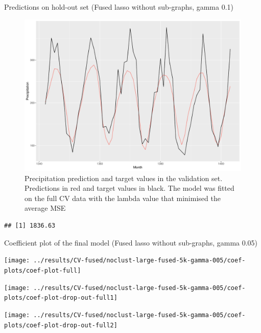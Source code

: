 \documentclass[
  ignorenonframetext,
]{beamer}
\begin{document}
\begin{frame}[fragile]{Predictions on hold-out set (Fused lasso without
sub-graphs, gamma 0.1)}
\protect\hypertarget{predictions-on-hold-out-set-fused-lasso-without-sub-graphs-gamma-0.1-1}{}
\begin{figure}

{\centering \includegraphics[width=0.75\linewidth]{ma-presentation_files/figure-beamer/pred-plot-full-fused-noclust-05-1} 

}

\caption{Precipitation prediction and target values in the validation set. Predictions in red and target values in black. The model was fitted on the full CV data with the lambda value that minimised the average MSE}\label{fig:pred-plot-full-fused-noclust-05}
\end{figure}

\begin{verbatim}
## [1] 1836.63
\end{verbatim}
\end{frame}

\begin{frame}{Coefficient plot of the final model (Fused lasso without
sub-graphs, gamma 0.05)}
\protect\hypertarget{coefficient-plot-of-the-final-model-fused-lasso-without-sub-graphs-gamma-0.05}{}
\begin{center}\texttt{[image: ../results/CV-fused/noclust-large-fused-5k-gamma-005/coef-plots/coef-plot-full]} \end{center}

\begin{center}\texttt{[image: ../results/CV-fused/noclust-large-fused-5k-gamma-005/coef-plots/coef-plot-drop-out-full1]} \end{center}

\begin{center}\texttt{[image: ../results/CV-fused/noclust-large-fused-5k-gamma-005/coef-plots/coef-plot-drop-out-full2]} \end{center}
\end{frame}
\end{document}
